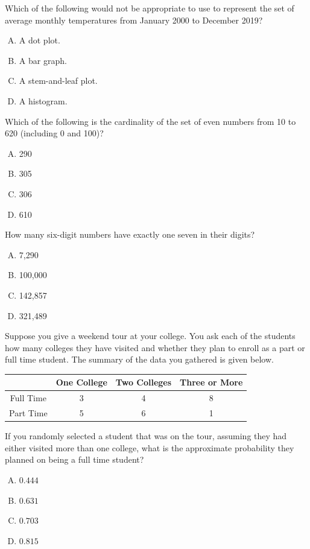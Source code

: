 \documentclass[12pt,letterpaper]{exam}
\begin{document}
\begin{questions}
\vfill

\question Which of the following would not be appropriate to use to represent the set of average monthly temperatures from January 2000 to December 2019?
	\begin{enumerate}[A.]
	\item A dot plot.
	\item A bar graph.
	\item A stem-and-leaf plot.
	\item A histogram.
	\end{enumerate}

\vfill

\question Which of the following is the cardinality of the set of even numbers from 10 to 620 (including 0 and 100)?
	\begin{enumerate}[A.]
	\item 290
	\item 305
	\item 306
	\item 610
	\end{enumerate}

\vfill

\question How many six-digit numbers have exactly one seven in their digits?
	\begin{enumerate}[A.]
	\item 7,290
	\item 100,000
	\item 142,857
	\item 321,489
	\end{enumerate}

\vfill

\question Suppose you give a weekend tour at your college. You ask each of the students how many colleges they have visited and whether they plan to enroll as a part or full time student. The summary of the data you gathered is given below. \par
	\begin{table}[H]
	\centering
	\begin{tabular}{|c|c|c|c|} \hline
	& One College & Two Colleges & Three or More \\ \hline
	Full Time & 3 & 4 & 8 \\ \hline
	Part Time & 5 & 6 & 1 \\ \hline
	\end{tabular}
	\end{table}
If you randomly selected a student that was on the tour, assuming they had either visited more than one college, what is the approximate probability they planned on being a full time student?
	\begin{enumerate}[A.]
	\item $0.444$
	\item $0.631$
	\item $0.703$
	\item $0.815$
	\end{enumerate}


\end{questions}
\end{document}
